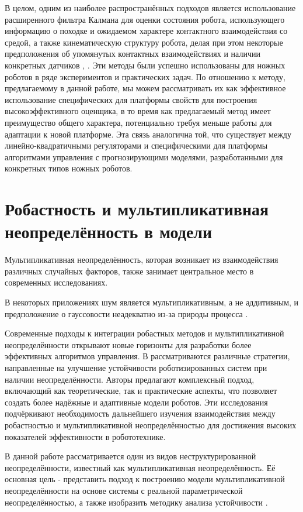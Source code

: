 В целом, одним из наиболее распространённых подходов является использование расширенного фильтра Калмана для оценки состояния робота, использующего информацию о походке и ожидаемом характере контактного взаимодействия со средой, а также кинематическую структуру робота, делая при этом некоторые предположения об упомянутых контактных взаимодействиях и наличии конкретных датчиков \cite{Bloesch2012}, \cite{Teng2021}. Эти методы были успешно использованы для ножных роботов в ряде экспериментов и практических задач. По отношению к методу, предлагаемому в данной работе, мы можем рассматривать их как эффективное использование специфических для платформы свойств для построения высокоэффективного оценщика, в то время как предлагаемый метод имеет преимущество общего характера, потенциально требуя меньше работы для адаптации к новой платформе. Эта связь аналогична той, что существует между линейно-квадратичными регуляторами и специфическими для платформы алгоритмами управления с прогнозирующими моделями, разработанными для конкретных типов ножных роботов.

\section{Робастность и мультипликативная неопределённость в модели}\label{sec:ch1/sec5}
Мультипликативная неопределённость, которая возникает из взаимодействия различных случайных факторов, также занимает центральное место в современных исследованиях.

В некоторых приложениях шум является мультипликативным, а не аддитивным, и предположение о гауссовости неадекватно из-за природы процесса \cite{Bosse2016}.

Современные подходы к интеграции робастных методов и мультипликативной неопределённости открывают новые горизонты для разработки более эффективных алгоритмов управления. В рассматриваются различные стратегии, направленные на улучшение устойчивости роботизированных систем при наличии неопределённости. Авторы предлагают комплексный подход, включающий как теоретические, так и практические аспекты, что позволяет создать более надёжные и адаптивные модели роботов. Эти исследования подчёркивают необходимость дальнейшего изучения взаимодействия между робастностью и мультипликативной неопределённостью для достижения высоких показателей эффективности в робототехнике.

В данной работе рассматривается один из видов неструктурированной неопределённости, известный как мультипликативная неопределённость. Её основная цель - представить подход к построению модели мультипликативной неопределённости на основе системы с реальной параметрической неопределённостью, а также изобразить методику анализа устойчивости \cite{Skogestad2005}.

